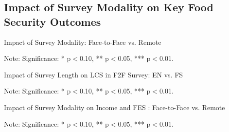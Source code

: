\documentclass[11pt,harvard]{article}
\begin{document}
	\subsection{Impact of Survey Modality on Key Food Security Outcomes}
	\begin{table}[htbp]
		\centering
		\begin{adjustbox}{max width=\textwidth}
			\begin{threeparttable}
				\caption{Impact of Survey Modality: Face-to-Face vs. Remote}
				\scriptsize
				 
				\label{tab:Ecuador_Outcome_Modality_Balance}
				\begin{tablenotes}
					\item Note: Significance: * p$<$0.10, ** p$<$0.05, *** p$<$0.01. 
				\end{tablenotes}
			\end{threeparttable}
		\end{adjustbox}
	\end{table}
	
	\begin{table}[htbp]
		\centering
		\begin{adjustbox}{max width=\textwidth}
			\begin{threeparttable}
				\caption{Impact of Survey Length on LCS in F2F Survey: EN vs. FS}
				\scriptsize
				 
				\label{tab:Ecuador_LCS_F2F_Length_Balance}
				\begin{tablenotes}
					\item Note: Significance: * p$<$0.10, ** p$<$0.05, *** p$<$0.01. 
				\end{tablenotes}
			\end{threeparttable}
		\end{adjustbox}
	\end{table}
	
	
	\begin{table}[htbp]
		\centering
		\begin{adjustbox}{max width=\textwidth}
			\begin{threeparttable}
				\caption{Impact of Survey Modality on Income and FES : Face-to-Face vs. Remote}
				\scriptsize
				 
				\label{tab:Ecuador_IncFes_Modality_Balance}
				\begin{tablenotes}
					\item Note: Significance: * p$<$0.10, ** p$<$0.05, *** p$<$0.01. 
				\end{tablenotes}
			\end{threeparttable}
		\end{adjustbox}
	\end{table}
	
\end{document}
